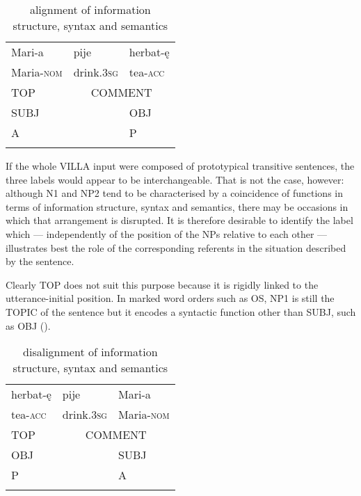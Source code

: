 \begin{table}
    \begin{tabular}{lll}
    \lsptoprule
        Mari-a & pije & herbat-ę\\
        Maria-\textsc{nom} & drink.\textsc{3sg} & tea-\textsc{acc}\\
        TOP & \multicolumn{2}{c}{COMMENT}\\
        SUBJ &  & OBJ\\
        A &  & P\\
    \lspbottomrule
    \end{tabular}
    \caption{alignment of information structure, syntax and semantics}
    \label{tab:01:1}
\end{table}

If the whole VILLA input were composed of prototypical transitive sentences, the three labels would appear to be interchangeable. That is not the case, however: although N1 and NP2 tend to be characterised by a coincidence of functions in terms of information structure, syntax and semantics, there may be occasions in which that arrangement is disrupted. It is therefore desirable to identify the label which — independently of the position of the NPs relative to each other — illustrates best the role of the corresponding referents in the situation described by the sentence.

Clearly TOP does not suit this purpose because it is rigidly linked to the utterance-initial position. In marked word orders such as OS, NP1 is still the TOPIC of the sentence but it encodes a syntactic function other than SUBJ, such as OBJ ().

\begin{table}
    \begin{tabular}{lll}
    \lsptoprule
        herbat-ę & pije & Mari-a \\
        tea-\textsc{acc} & drink.\textsc{3sg} & Maria-\textsc{nom}\\
        TOP & \multicolumn{2}{c}{COMMENT}\\
        OBJ &  & SUBJ\\
        P &  & A\\
    \lspbottomrule
    \end{tabular}
    \caption{disalignment of information structure, syntax and semantics}
    \label{tab:01:2}
\end{table}

